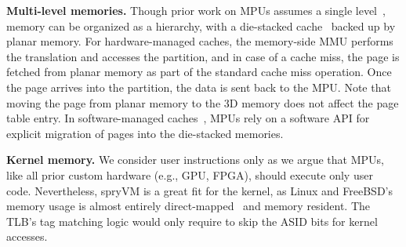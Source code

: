 

\noindent\textbf{Multi-level memories.} Though prior work on MPUs assumes a single level~\cite{gao:practical, ahn:scalable, pugsley:ndc, ahn:pim-enabled}, memory can be organized as a hierarchy, with a die-stacked cache~\cite{reinders:knights, volos:fat} backed up by planar memory. For hardware-managed caches, the memory-side MMU performs the translation and accesses the partition, and in case of a cache miss, the page is fetched from planar memory as part of the standard cache miss operation. Once the page arrives into the partition, the data is sent back to the MPU. Note that moving the page from planar memory to the 3D memory does not affect the page table entry. In software-managed caches~\cite{reinders:knights}, MPUs rely on a software API for explicit migration of pages into the die-stacked memories.


\noindent\textbf{Kernel memory.} We consider user instructions only as we argue that MPUs, like all prior custom hardware (e.g., GPU, FPGA), should execute only user code. Nevertheless, spryVM is a great fit for the kernel, as Linux and FreeBSD's memory usage is almost entirely direct-mapped~\cite{mauerer:professional, mckusick:design} and memory resident. The TLB's tag matching logic would only require to skip the ASID bits for kernel accesses.

